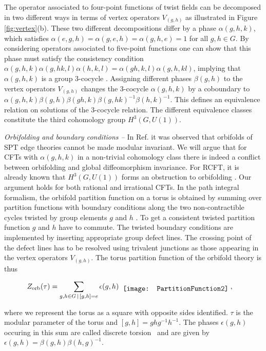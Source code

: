 \documentclass[aps,pra,twocolumn,superscriptaddress,10pt,article,nofootinbib,showpacs]{revtex4-1}
\begin{document}
The operator associated to four-point functions of twist fields can be decomposed in two different ways in terms of vertex operators $V_{(g,h)}$ as illustrated in Figure \ref{fig:vertex}(b). These two different decompositions differ by a phase $\alpha(g,h,k)$, which satisfies $\alpha(e,g,h)=\alpha(g,e,h)=\alpha(g,h,e)=1$ for all $g,h \in G$. By considering operators associated to five-point functions one can show that this phase must satisfy the consistency condition $\alpha(g,h,k)\alpha(g,hk,l)\alpha(h,k,l)=\alpha(gh,k,l)\alpha(g,h,kl)$, implying that $\alpha(g,h,k)$ is a group 3-cocycle \cite{MooreSeiberg}. Assigning different phases $\beta(g,h)$ to the vertex operators $V_{(g,h)}$ changes the 3-cocycle $\alpha(g,h,k)$ by a coboundary to $\alpha(g,h,k)\beta(g,h)\beta(gh,k)\beta(g,hk)^{-1}\beta(h,k)^{-1}$. This defines an equivalence relation on solutions of the 3-cocycle relation. The different equivalence classes constitute the third cohomology group $H^3(G,U(1))$. 


\emph{Orbifolding and boundary conditions -- } In Ref. \cite{RyuZhang,SuleChen,HsiehSule} it was observed that orbifolds of SPT edge theories cannot be made modular invariant. We will argue that for CFTs with $\alpha(g,h,k)$ in a non-trivial cohomology class there is indeed a conflict between orbifolding and global diffeomorphism invariance. For RCFT, it is already known that $H^3(G,U(1))$ forms an obstruction to orbifolding \cite{FrohlichFuchs1,FuchsRunkel}. Our argument holds for both rational and irrational CFTs. In the path integral formalism, the orbifold partition function on a torus is obtained by summing over partition functions with boundary conditions along the two non-contractible cycles twisted by group elements $g$ and $h$ \cite{DixonHarvey,Dijkgraaf}. To get a consistent twisted partition function $g$ and $h$ have to commute. The twisted boundary conditions are implemented by inserting appropriate group defect lines. The crossing point of the defect lines has to be resolved using trivalent junctions as those appearing in the vertex operators $V_{(g,h)}$. The torus partition function of the orbifold theory is thus

\begin{align}
Z_{\text{orb}}(\tau)=\sum_{g,h\in G\, |\,[g,h]=e} \epsilon(g,h)
 & \hspace{2 mm} \raisebox{-.4\height}{\texttt{[image: PartitionFunction2]}}\; ,
\end{align}

where we represent the torus as a square with opposite sides identified. $\tau$ is the modular parameter of the torus and $[g,h]=ghg^{-1}h^{-1}$. The phases $\epsilon(g,h)$ occuring in this sum are called discrete torsion~\cite{Vafa1} and are given by $\epsilon(g,h)=\beta(g,h)\beta(h,g)^{-1}$.
\end{document}
